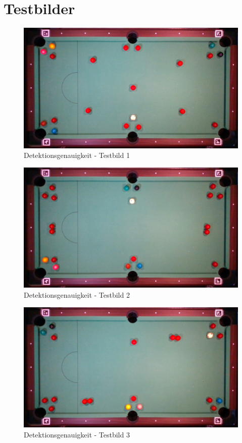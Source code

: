 \section{Testbilder}\label{anhang:testbilder}

\begin{figure}[h!]
    \begin{center}
        \includegraphics[width=0.8\linewidth]{../common/07_appendix/resources/00_detection/00_detektion_testbild_1.png}
    \end{center}
    \caption{Detektionsgenauigkeit - Testbild 1}
    \label{fig:detektionsgenauigkeit:testbild:1}
\end{figure}
\begin{figure}[h!]
    \begin{center}
        \includegraphics[width=0.8\linewidth]{../common/07_appendix/resources/00_detection/01_detektion_testbild_2.png}
    \end{center}
    \caption{Detektionsgenauigkeit - Testbild 2}
    \label{fig:detektionsgenauigkeit:testbild:2}
\end{figure}
\begin{figure}[h!]
    \begin{center}
        \includegraphics[width=0.8\linewidth]{../common/07_appendix/resources/00_detection/02_detektion_testbild_3.png}
    \end{center}
    \caption{Detektionsgenauigkeit - Testbild 3}
    \label{fig:detektionsgenauigkeit:testbild:3}
\end{figure}
